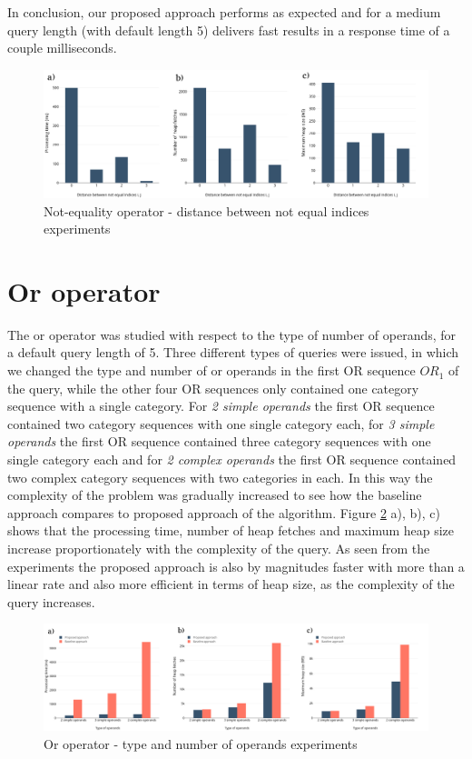 In conclusion, our proposed approach performs as expected and for a medium query length (with default length 5) delivers fast results in a response time of a couple milliseconds.

\begin{figure}[H]
	\includegraphics[scale=0.3]{images/neo_distance.png}
	\centering
	\caption{Not-equality operator - distance between not equal indices experiments}
	\label{fig:neo_distance}
\end{figure}


\section{Or operator}
\label{sec:experimentsOr}

The or operator was studied with respect to the type of number of operands, for a default query length of 5. Three different types of queries were issued, in which we changed the type and number of or operands in the first OR sequence $OR_1$ of the query, while the other four OR sequences only contained one category sequence with a single category. For \textit{2 simple operands} the first OR sequence contained two category sequences with one single category each, for \textit{3 simple operands} the first OR sequence contained three category sequences with one single category each and for \textit{2 complex operands} the first OR sequence contained two complex category sequences with two categories in each. In this way the complexity of the problem was gradually increased to see how the baseline approach compares to proposed approach of the algorithm.  
Figure \ref{fig:or} a), b), c) shows that the processing time, number of heap fetches and maximum heap size increase proportionately with the complexity of the query. As seen from the experiments the proposed approach is also by magnitudes faster with more than a linear rate and also more efficient in terms of heap size, as the complexity of the query increases. 

\begin{figure}[H]
	\includegraphics[scale=0.25]{images/or.png}
	\centering
	\caption{Or operator - type and number of operands experiments}
	\label{fig:or}
\end{figure}


